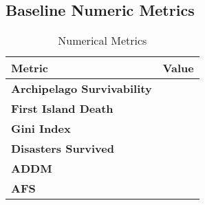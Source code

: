 \subsection{Baseline Numeric Metrics}
\label{subsec:Simulations:baseline:num_metrics}
\begin{table}[htb]
    \centering
    \begin{tabular}{|l|l|}
    \hline
    \textbf{Metric}                     & \textbf{Value} \\ \hline
    \textbf{Archipelago Survivability}  &       \\
    \textbf{First Island Death}         &       \\
    \textbf{Gini Index}                 &       \\
    \textbf{Disasters Survived}         &       \\
    \textbf{ADDM}                       &       \\
    \textbf{AFS}                        &       \\ \hline
\end{tabular}
\caption{Numerical Metrics}
\end{table}

